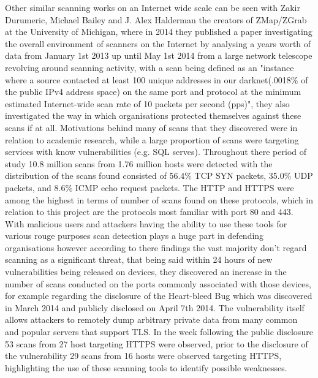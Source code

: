 \documentclass[a4wide,leqno,12pt]{report}
\begin{document}
Other similar scanning works on an Internet wide scale can be seen with Zakir Durumeric, Michael Bailey and J. Alex Halderman the creators of ZMap/ZGrab at the University of Michigan,  where in 2014 they published a paper\cite{durumeric2014internet} investigating the overall environment of scanners on the Internet by analysing a years worth of data from January 1st 2013 up until May 1st 2014 from a large network telescope revolving around scanning activity, with a scan being defined as an "instance where a source contacted at least 100 unique addresses in our darknet(.0018\% of the public IPv4 address space) on the same port and protocol at the minimum estimated Internet-wide scan rate of 10 packets per second (pps)", they also investigated the way in which organisations protected themselves against these scans if at all. Motivations behind many of scans that they discovered were in relation to academic research, while a large proportion of scans were targeting services with know vulnerabilities (e.g. SQL serves). Throughout there period of study 10.8 million scans from 1.76 million hosts were detected with the distribution of the scans found consisted of 56.4\% TCP SYN packets, 35.0\% UDP packets, and 8.6\% ICMP echo request packets. The HTTP and HTTPS were among the highest in terms of number of scans found on these protocols, which in relation to this project are the protocols most familiar with port 80 and 443. With malicious users and attackers having the ability to use these tools for various rouge purposes scan detection plays a huge part in defending organisations however according to there findings the vast majority don't regard scanning as a significant threat, that being said within 24 hours of new vulnerabilities being released on devices, they discovered an increase in the number of scans conducted on the ports commonly associated with those devices, for example regarding the disclosure of the Heart-bleed Bug \cite{durumeric2014matter} which was discovered in March 2014 and publicly disclosed on April 7th 2014. The vulnerability itself allows attackers to remotely dump arbitrary private data from many common and popular servers that support TLS. In the week following the public disclosure 53 scans from 27 host targeting HTTPS were observed, prior to the disclosure of the vulnerability 29 scans from 16 hosts were observed targeting HTTPS, highlighting the use of these scanning tools to identify possible weaknesses. \\
\end{document}
